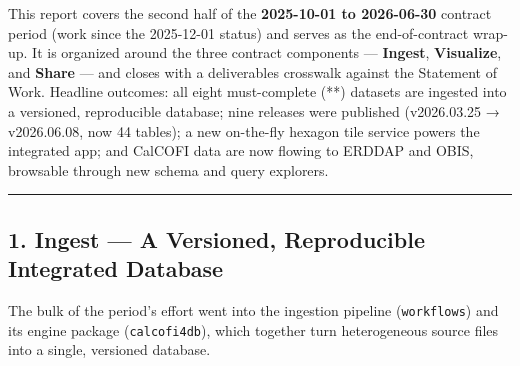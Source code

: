 \documentclass[
  letterpaper,
  DIV=11,
  numbers=noendperiod]{scrreprt}
\begin{document}
This report covers the second half of the \textbf{2025-10-01 to
2026-06-30} contract period (work since the 2025-12-01 status) and
serves as the end-of-contract wrap-up. It is organized around the three
contract components --- \textbf{Ingest}, \textbf{Visualize}, and
\textbf{Share} --- and closes with a deliverables crosswalk against the
Statement of Work. Headline outcomes: all eight must-complete (**)
datasets are ingested into a versioned, reproducible database; nine
releases were published (v2026.03.25 → v2026.06.08, now 44 tables); a
new on-the-fly hexagon tile service powers the integrated app; and
CalCOFI data are now flowing to ERDDAP and OBIS, browsable through new
schema and query explorers.

\begin{center}\rule{0.5\linewidth}{0.5pt}\end{center}

\subsection{1. Ingest --- A Versioned, Reproducible Integrated
Database}\label{ingest-a-versioned-reproducible-integrated-database}

The bulk of the period's effort went into the ingestion pipeline
(\texttt{workflows}) and its engine package (\texttt{calcofi4db}), which
together turn heterogeneous source files into a single, versioned
database.
\end{document}
